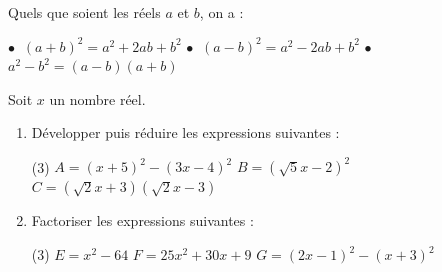 \documentclass[10pt, a4paper]{article}
\begin{document}
\begin{Propriete}[]
Quels que soient les réels $a$ et $b$, on a :
\vspace{0.2cm}

    $\bullet~$ $(a+b)^2 = a^2 + 2ab + b^2$ \hfill
    $\bullet~$ $(a-b)^2 = a^2 - 2ab + b^2$ \hfill
    $\bullet~$ $a^2 - b^2 = (a-b)(a+b)$
\end{Propriete}


\begin{Application}[][20 min]
Soit $x$ un nombre réel.
\begin{enumerate}
    \item Développer puis réduire les expressions suivantes :
    \begin{tasks}[label=$\bullet$, label-width=5pt, item-indent=15pt](3)
        \task $A = (x + 5)^2  - (3x - 4)^2$
        \task $B = (\sqrt{5}x - 2)^2$
        \task $C = (\sqrt{2}x + 3)(\sqrt{2}x - 3)$
    \end{tasks}

    \item Factoriser les expressions suivantes  :
    \begin{tasks}[label=$\bullet$, label-width=5pt, item-indent=15pt](3)
        \task $E = x^2 - 64$
        \task $F = 25x^2 + 30x + 9$
        \task $G = (2x - 1)^2 - (x + 3)^2$
    \end{tasks}

\end{enumerate}
\end{Application}
\end{document}

